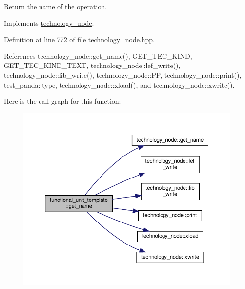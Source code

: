 Return the name of the operation. 



Implements \hyperlink{structtechnology__node_ade1d568637cfe8de91fc732fba4d62d5}{technology\+\_\+node}.



Definition at line 772 of file technology\+\_\+node.\+hpp.



References technology\+\_\+node\+::get\+\_\+name(), G\+E\+T\+\_\+\+T\+E\+C\+\_\+\+K\+I\+ND, G\+E\+T\+\_\+\+T\+E\+C\+\_\+\+K\+I\+N\+D\+\_\+\+T\+E\+XT, technology\+\_\+node\+::lef\+\_\+write(), technology\+\_\+node\+::lib\+\_\+write(), technology\+\_\+node\+::\+PP, technology\+\_\+node\+::print(), test\+\_\+panda\+::type, technology\+\_\+node\+::xload(), and technology\+\_\+node\+::xwrite().

Here is the call graph for this function\+:
\nopagebreak
\begin{figure}[H]
\begin{center}
\leavevmode
\includegraphics[width=350pt]{d7/d24/structfunctional__unit__template_a135ff73a6ceafc2ebb4e662b8b13f34e_cgraph}
\end{center}
\end{figure}
\mbox{\label{structfunctional__unit__template_a9dfb2331936da0d6c56ac8e80312b95b}} 
